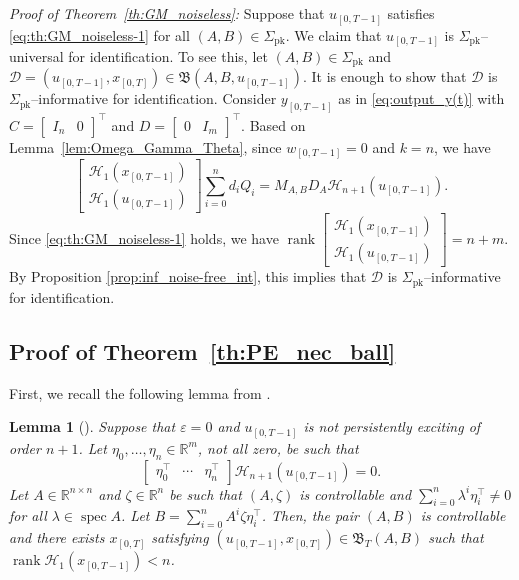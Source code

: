 \documentclass[journal,twoside,web]{ieeecolor}
\DeclareMathOperator{\rank}{rank}
\DeclareMathOperator{\spec}{spec}
\newtheorem{lemma}[theorem]{Lemma}
\begin{document}
\textit{Proof of Theorem~\ref{th:GM_noiseless}:} Suppose that $u_{[0,T-1]}$ satisfies \eqref{eq:th:GM_noiseless-1} for all \mbox{$(A,B)\in\Sigma_\text{pk}$}. We claim that $u_{[0,T-1]}$ is $\Sigma_\text{pk}$--universal for identification. To see this, let $(A,B)\in\Sigma_\text{pk}$ and \mbox{$\mathcal{D}=(u_{[0,T-1]},x_{[0,T]})\in\mathfrak{B}(A,B,u_{[0,T-1]})$}. It is enough to show that $\mathcal{D}$ is $\Sigma_\text{pk}$--informative for identification. Consider $y_{[0,T-1]}$ as in \eqref{eq:output_y(t)} with $C=\begin{bmatrix}
I_n & 0
\end{bmatrix}^\top$ and $D=\begin{bmatrix}
0 & I_m
\end{bmatrix}^\top$. Based on Lemma~\ref{lem:Omega_Gamma_Theta}, since $w_{[0,T-1]}=0$ and $k=n$, we have
\begin{equation}
\label{eq:GM_formula}
\begin{bmatrix}
\mathcal{H}_{1}(x_{[0,T-1]}) \\ \mathcal{H}_{1}(u_{[0,T-1]})
\end{bmatrix}\sum_{i=0}^{n}d_iQ_i=M_{A,B}D_A\mathcal{H}_{n+1}(u_{[0,T-1]}).
\end{equation}
Since \eqref{eq:th:GM_noiseless-1} holds, we have $\rank \begin{bmatrix}
\mathcal{H}_{1}(x_{[0,T-1]}) \\ \mathcal{H}_{1}(u_{[0,T-1]})
\end{bmatrix}=n+m$. By Proposition \ref{prop:inf_noise-free_int}, this implies that $\mathcal{D}$ is \mbox{$\Sigma_\text{pk}$--informative} for identification. \hfill \QED

\subsection{Proof of Theorem~\ref{th:PE_nec_ball}}

First, we recall the following lemma from \cite{shakouri2025new}. 

\begin{lemma}[{\cite[Lem. 5]{shakouri2025new}}]
\label{lem:contruction}
Suppose that $\varepsilon=0$ and $u_{[0,T-1]}$ is not persistently exciting of order $n+1$. Let $\eta_0,\ldots,\eta_n\in\mathbb{R}^m$, not all zero, be such that
\begin{equation}
\label{eq:eta_ker}
\begin{bmatrix}
\eta_0^\top & \cdots & \eta_n^\top
\end{bmatrix}\mathcal{H}_{n+1}(u_{[0,T-1]})=0.
\end{equation}
Let $A\in\mathbb{R}^{n\times n}$ and $\zeta\in\mathbb{R}^n$ be such that $(A,\zeta)$ is controllable and $\sum_{i=0}^n \lambda^i \eta_i^\top\neq 0$ for all $\lambda\in\spec A$. Let \linebreak $B=\sum_{i=0}^n A^i\zeta\eta_i^\top$. Then, the pair $(A,B)$ is controllable and there exists $x_{[0,T]}$ satisfying $(u_{[0,T-1]},x_{[0,T]})\in\mathfrak{B}_T(A,B)$ such that $\rank \mathcal{H}_1(x_{[0,T-1]})<n$. 
\end{lemma}
\end{document}
